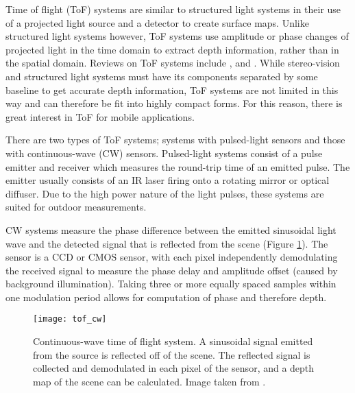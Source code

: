 \documentclass[class=article, crop=false]{standalone}
\begin{document}
Time of flight (ToF) systems are similar to structured light systems in their use of a projected light source and a detector to create surface maps. Unlike structured light systems however, ToF systems use amplitude or phase changes of projected light in the time domain to extract depth information, rather than in the spatial domain. Reviews on ToF systems include \parencite{Horaud2016}, \parencite{tofbook} and \parencite{Kolb2010}. While stereo-vision and structured light systems must have its components separated by some baseline to get accurate depth information, ToF systems are not limited in this way and can therefore be fit into highly compact forms. For this reason, there is great interest in ToF for mobile applications.
\par 
There are two types of ToF systems; systems with pulsed-light sensors and those with continuous-wave (CW) sensors. Pulsed-light systems consist of a pulse emitter and receiver which measures the round-trip time of an emitted pulse. The emitter usually consists of an IR laser firing onto a rotating mirror or optical diffuser. Due to the high power nature of the light pulses, these systems are suited for outdoor measurements.
\par 
CW systems measure the phase difference between the emitted sinusoidal light wave and the detected signal that is reflected from the scene (Figure \ref{tof_cw}). The sensor is a CCD or CMOS sensor, with each pixel independently demodulating the received signal to measure the phase delay and amplitude offset (caused by background illumination). Taking three or more equally spaced samples within one modulation period allows for computation of phase and therefore depth.

\begin{figure}[!h]
	\centering
	\texttt{[image: tof\_cw]}
	\caption{Continuous-wave time of flight system. A sinusoidal signal emitted from the source is reflected off of the scene. The reflected signal is collected and demodulated in each pixel of the sensor, and a depth map of the scene can be calculated. Image taken from \parencite{Kolb2010}.}
	\label{tof_cw}
\end{figure}
\end{document}
